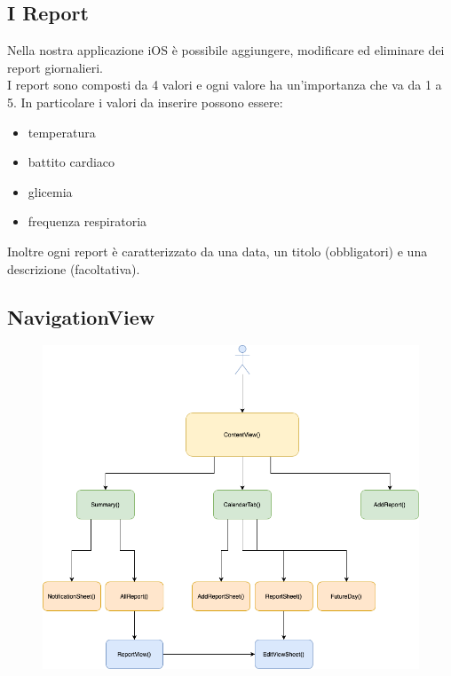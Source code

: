 \documentclass{article}
\begin{document}
\medskip

\subsection{I Report}

Nella nostra applicazione iOS è possibile aggiungere, modificare ed eliminare dei report giornalieri. \\
I report sono composti da 4 valori e ogni valore ha un'importanza che va da 1 a 5. In particolare i valori da inserire possono essere: 
\begin{itemize}
  \item temperatura
  \item battito cardiaco
  \item glicemia
  \item frequenza respiratoria
\end{itemize}

Inoltre ogni report è caratterizzato da una data, un titolo (obbligatori) e una descrizione (facoltativa). 

\subsection{NavigationView}

\begin{figure}[htp]

\centering
\includegraphics[width=1.1\textwidth]{img/NavigationView.png}\
\label{fig:figure0}

\end{figure}
\end{document}
